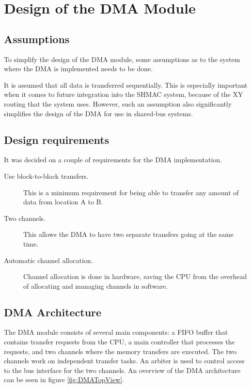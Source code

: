 \section{Design of the DMA Module}
\label{sec:dma-architecture}

\subsection{Assumptions}
To simplify the design of the DMA module, some assumptions as to the system where the
DMA is implemented needs to be done.

It is assumed that all data is transferred sequentially. This is especially important when
it comes to future integration into the SHMAC system, because of the XY routing that the
system uses. However, such an assumption also significantly simplifies the design of the
DMA for use in shared-bus systems.

\subsection{Design requirements}

It was decided on a couple of requirements for the DMA implementation.

\begin{description}
	\item[Use block-to-block transfers.] This is a minimum requirement for being
	able to transfer any amount of data from location A to B.
	\item[Two channels.] This allows the DMA to have two separate transfers going
	at the same time.
	\item[Automatic channel allocation.] Channel allocation is done in hardware,
	saving the CPU from the overhead of allocating and managing channels in software.
\end{description}

\subsection{DMA Architecture}
The DMA module consists of several main components: a FIFO buffer that contains transfer
requests from the CPU, a main controller that processes the requests, and two channels
where the memory transfers are executed. The two channels work on independent transfer
tasks. An arbiter is used to control access to the bus interface for the two channels.
An overview of the DMA architecture can be seen in figure \ref{fig:DMATopView}.

